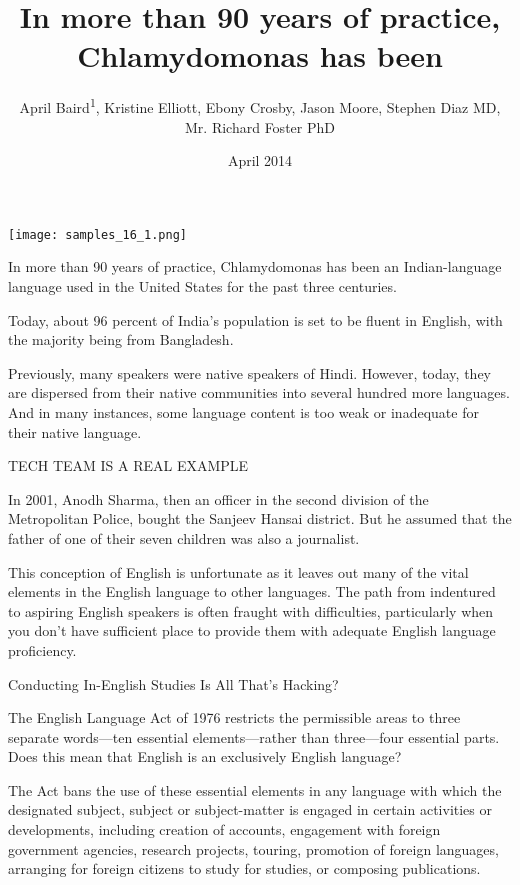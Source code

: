 \documentclass{article}
\title{In more than 90 years of practice, Chlamydomonas has been}
\author{April Baird\textsuperscript{1},  Kristine Elliott,  Ebony Crosby,  Jason Moore,  Stephen Diaz MD,  Mr. Richard Foster PhD}
\affil{\textsuperscript{1}Northeastern University}
\date{April 2014}
\begin{document}
\maketitle

\begin{center}
\begin{minipage}{0.75\linewidth}
\texttt{[image: samples\_16\_1.png]}
\end{minipage}
\end{center}

In more than 90 years of practice, Chlamydomonas has been an Indian-language language used in the United States for the past three centuries.

Today, about 96 percent of India’s population is set to be fluent in English, with the majority being from Bangladesh.

Previously, many speakers were native speakers of Hindi. However, today, they are dispersed from their native communities into several hundred more languages. And in many instances, some language content is too weak or inadequate for their native language.

TECH TEAM IS A REAL EXAMPLE

In 2001, Anodh Sharma, then an officer in the second division of the Metropolitan Police, bought the Sanjeev Hansai district. But he assumed that the father of one of their seven children was also a journalist.

This conception of English is unfortunate as it leaves out many of the vital elements in the English language to other languages. The path from indentured to aspiring English speakers is often fraught with difficulties, particularly when you don’t have sufficient place to provide them with adequate English language proficiency.

Conducting In-English Studies Is All That’s Hacking?

The English Language Act of 1976 restricts the permissible areas to three separate words—ten essential elements—rather than three—four essential parts. Does this mean that English is an exclusively English language?

The Act bans the use of these essential elements in any language with which the designated subject, subject or subject-matter is engaged in certain activities or developments, including creation of accounts, engagement with foreign government agencies, research projects, touring, promotion of foreign languages, arranging for foreign citizens to study for studies, or composing publications.
\end{document}
